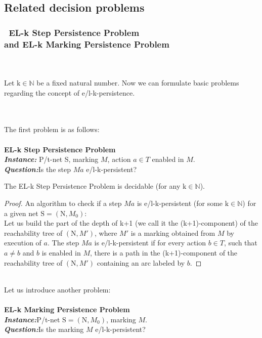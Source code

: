 \documentclass[a4paper]{llncs}
\begin{document}
\subsection{Related decision problems}

\subsubsection{\textbullet\ EL-k Step Persistence Problem \\and EL-k Marking Persistence Problem}\mbox{ }\\ \\
Let $\mathrm{k}\in\mathbb{N}$ be a fixed natural number. Now we can formulate basic problems regarding the concept of e/l-k-persistence. \\ \\
\newpage

\mbox{ }\\
The first problem is as follows:
\\ \\
\textbf{EL-k Step Persistence Problem}
\\
\indent\textbf{\emph{Instance:}} P/t-net S, marking $M$, action $a \in T$ enabled in $M$.\\
\indent\textbf{\emph{Question:}}Is the step $Ma$ e/l-k-persistent?

\begin{theorem}
\label{t45}
The EL-k Step Persistence Problem is decidable (for any $\mathrm{k} \in \mathbb{N}$).
\end{theorem}

\begin{proof}
An algorithm to check if a step $Ma$ is e/l-k-persistent (for some $\mathrm{k} \in \mathbb{N}$) for a given net $\mathrm{S}=(\mathrm{N},M_0)$:\\
Let us build the part of the depth of k+1 (we call it the (k+1)-component) of the reachability tree of $(\mathrm{N},M')$, where $M'$ is a marking obtained from $M$ by execution of $a$. The step $Ma$ is e/l-k-persistent if for every action $b \in T$, such that $a\neq b$ and $b$ is enabled in $M$, there is a path in the (k+1)-component of the reachability tree of $(\mathrm{N},M')$ containing an arc labeled by $b$. 	
\end{proof}\mbox{ }\\
Let us introduce another problem:
\\ \\
\textbf{EL-k Marking Persistence Problem}
\\
\indent\textbf{\emph{Instance:}}P/t-net $\mathrm{S}=(\mathrm{N}, M_0)$, marking $M$.\\
\indent\textbf{\emph{Question:}}Is the marking $M$ e/l-k-persistent?
\end{document}
